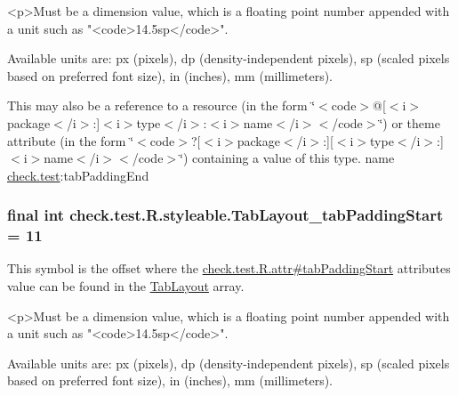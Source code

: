 \begin{DoxyVerb}      <p>Must be a dimension value, which is a floating point number appended with a unit such as "<code>14.5sp</code>".
\end{DoxyVerb}
 Available units are\+: px (pixels), dp (density-\/independent pixels), sp (scaled pixels based on preferred font size), in (inches), mm (millimeters). 

This may also be a reference to a resource (in the form \char`\"{}$<$code$>$@\mbox{[}$<$i$>$package$<$/i$>$\+:\mbox{]}$<$i$>$type$<$/i$>$\+:$<$i$>$name$<$/i$>$$<$/code$>$\char`\"{}) or theme attribute (in the form \char`\"{}$<$code$>$?\mbox{[}$<$i$>$package$<$/i$>$\+:\mbox{]}\mbox{[}$<$i$>$type$<$/i$>$\+:\mbox{]}$<$i$>$name$<$/i$>$$<$/code$>$\char`\"{}) containing a value of this type.  name \hyperlink{namespacecheck_1_1test}{check.\+test}\+:tab\+Padding\+End \hypertarget{classcheck_1_1test_1_1_r_1_1styleable_a680abf2e357062993996fc1cf323e63a}{}
\subsubsection[{Tab\+Layout\+\_\+tab\+Padding\+Start}]{\setlength{\rightskip}{0pt plus 5cm}final int check.\+test.\+R.\+styleable.\+Tab\+Layout\+\_\+tab\+Padding\+Start = 11\hspace{0.3cm}{\ttfamily [static]}}\label{classcheck_1_1test_1_1_r_1_1styleable_a680abf2e357062993996fc1cf323e63a}
This symbol is the offset where the \hyperlink{classcheck_1_1test_1_1_r_1_1attr_a196c7359dff257a9caccdbaa14a63e0b}{check.\+test.\+R.\+attr\#tab\+Padding\+Start} attribute\textquotesingle{}s value can be found in the \hyperlink{classcheck_1_1test_1_1_r_1_1styleable_a2a3232e8d38a43f5131a16385abbbed8}{Tab\+Layout} array.

\begin{DoxyVerb}      <p>Must be a dimension value, which is a floating point number appended with a unit such as "<code>14.5sp</code>".
\end{DoxyVerb}
 Available units are\+: px (pixels), dp (density-\/independent pixels), sp (scaled pixels based on preferred font size), in (inches), mm (millimeters). 

